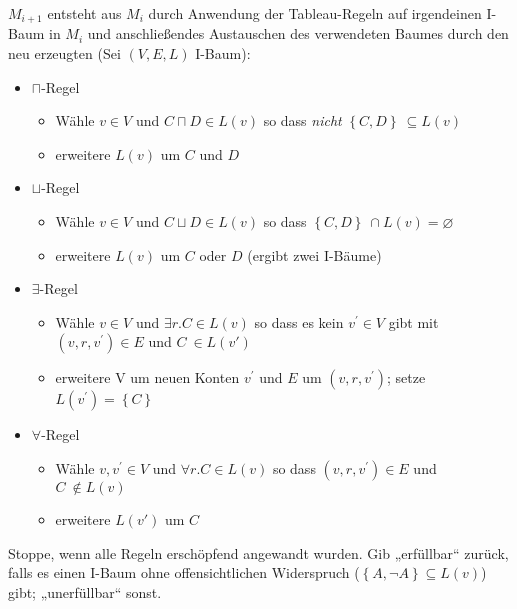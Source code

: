$M_{i + 1}$ entsteht aus $M_{i}$ durch Anwendung der Tableau-Regeln
auf irgendeinen I-Baum in $M_{i}$ und anschließendes Austauschen des
verwendeten Baumes durch den neu erzeugten (Sei $\left( V,E,L \right)$
I-Baum):

\begin{itemize}
\item
  $\sqcap$-Regel

  \begin{itemize}
  \item
    Wähle $v \in V$ und $C \sqcap D \in L\left( v \right)$ so dass
    \emph{nicht} $\left\{ C,D \right\}\  \subseteq L\left( v \right)$
  \item
    erweitere $L(v)$ um $C$ und $D$
  \end{itemize}
\item
  $\sqcup$-Regel

  \begin{itemize}
  \item
    Wähle $v \in V$ und $C \sqcup D \in L\left( v \right)$ so dass
    $\left\{ C,D \right\}\  \cap L\left( v \right) = \varnothing$
  \item
    erweitere $L(v)$ um $C$ oder $D$ (ergibt zwei I-Bäume)
  \end{itemize}
\item
  $\exists$-Regel

  \begin{itemize}
  \item
    Wähle $v \in V$ und $\exists r.C \in L\left( v \right)$ so dass
    es kein $v^{'} \in V$ gibt mit $\left( v,r,v^{'} \right) \in E$
    und $C\  \in L\left( v' \right)$
  \item
    erweitere V um neuen Konten $v^{'}$ und $E$ um
    $\left( v,r,v^{'} \right)$; setze
    $L\left( v^{'} \right) = \left\{ C \right\}$
  \end{itemize}
\item
  $\forall$-Regel

  \begin{itemize}
  \item
    Wähle $v,v^{'} \in V$ und $\forall r.C \in L\left( v \right)$ so
    dass $\left( v,r,v^{'} \right) \in E$ und
    $C\  \notin L\left( v \right)$
  \item
    erweitere $L(v')$ um $C$
  \end{itemize}
\end{itemize}

Stoppe, wenn alle Regeln erschöpfend angewandt wurden. Gib „erfüllbar``
zurück, falls es einen I-Baum ohne offensichtlichen Widerspruch
($\left\{ A,\neg A \right\} \subseteq L\left( v \right)$) gibt;
„unerfüllbar`` sonst.

